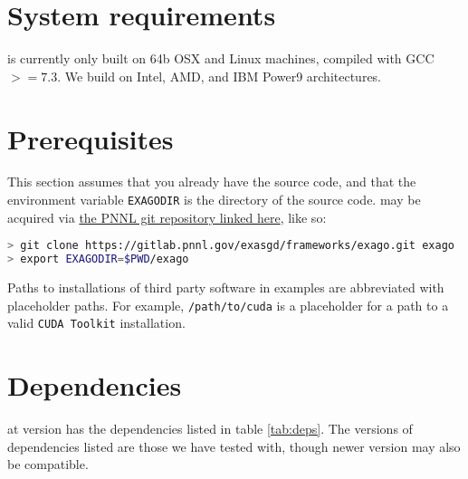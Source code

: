 \section{System requirements}

\exago is currently only built on 64b OSX and Linux machines, compiled with GCC $>= 7.3$.
We build \exago on Intel, AMD, and IBM Power9 architectures.

\section{Prerequisites}

This section assumes that you already have the \exago source code, and that the environment variable \texttt{EXAGODIR} is the directory of the \exago source code.
\exago may be acquired via \href{https://gitlab.pnnl.gov/exasgd/frameworks/exago}{the PNNL git repository linked here}, like so:

\begin{lstlisting}[language=bash]
> git clone https://gitlab.pnnl.gov/exasgd/frameworks/exago.git exago
> export EXAGODIR=$PWD/exago
\end{lstlisting}

Paths to installations of third party software in examples are abbreviated with placeholder paths.
For example, \texttt{/path/to/cuda} is a placeholder for a path to a valid \texttt{CUDA Toolkit} installation.

\section{Dependencies}

\exago at version \exagoversion has the dependencies listed in table \ref{tab:deps}. The versions of dependencies listed are those we have tested with, though newer version may also be compatible.

